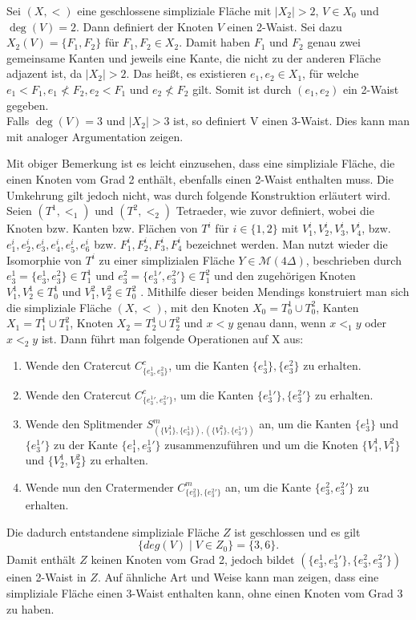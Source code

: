 \documentclass[12pt,titlepage]{article}
\begin{document}
\begin{bemerkung}
Sei $(X,<)$ eine geschlossene simpliziale Fläche mit $\vert X_2 \vert > 2$, $V \in X_0$ und $\deg(V)=2$. Dann definiert der Knoten $V$ einen 2-Waist. Sei dazu $X_2(V)=\{F_1,F_2\}$ für $F_1,F_2 \in X_2$. Damit haben $F_1$ und $F_2$ genau zwei gemeinsame Kanten und jeweils eine Kante, die nicht zu der anderen Fläche adjazent ist, da $\vert X_2 \vert > 2$. Das heißt, es existieren $e_1,e_2\in X_1$, für welche $e_1<F_1,e_1 \nless F_2, e_2<F_1$ und $e_2  \nless F_2$ gilt. Somit ist durch $(e_1,e_2)$ ein 2-Waist gegeben.\\
Falls $\deg(V)=3$ und $\vert X_2 \vert>3$ ist, so definiert V einen 3-Waist. Dies kann man mit analoger Argumentation zeigen.
\end{bemerkung}
Mit obiger Bemerkung ist es leicht einzusehen, dass eine simpliziale Fläche, die einen Knoten vom Grad 2 enthält, ebenfalls einen 2-Waist enthalten muss. Die Umkehrung gilt jedoch nicht, was durch folgende Konstruktion erläutert wird.\\
 Seien $(T^1,<_1)$ und $(T^2,<_2)$ Tetraeder, wie zuvor definiert, wobei die Knoten bzw. Kanten bzw. Flächen von $T^i$ für $i\in \{1,2\}$ mit $V_1^i,V_2^i,V_3^i,V_4^i$, bzw. $e_1^i,e_2^i,e_3^i,e_4^i,e_5^i,e_6^i$ bzw. $F_1^i,F_2^i,F_3^i,F_4^i$ bezeichnet werden. Man nutzt wieder die Isomorphie von  $T^i$ zu einer simplizialen Fläche $Y\in \mathcal{M}(4 \Delta)$, beschrieben durch $e_3^1 =\{e_3^1,e_3^2\}\in T^1_1 $ und $e_3^2=\{{e_3^1}',{e_3^2}'\}\in T^2_1$ 
   und den zugehörigen Knoten $V_1^1,V_2^1 \in T^1_0$ und $V_1^2,V_2^2 \in T^2_0$  . Mithilfe dieser beiden Mendings konstruiert man sich die simpliziale Fläche $(X,<)$, mit den Knoten $X_0=T^1_0 \cup T^2_0$, Kanten $X_1=T^1_1 \cup T^2_1$, Knoten $X_2=T^1_2 \cup T^2_2$ und $x<y$ genau dann, wenn $x<_1y$ oder $x<_2 y$ ist. Dann führt man folgende Operationen auf X aus:
 \begin{enumerate}
 \item Wende den Cratercut $C^c_{\{e_{3}^1,e_{3}^2\}}$, um die Kanten $\{e_3^1\},\{e_3^2\}$ zu erhalten.
 \item Wende den Cratercut $C^c_{\{{e_{3}^1}',{e_{3}^2}'\}}$, um die Kanten $\{{e_3^1}'\},\{{e_3^2}'\}$ zu erhalten.
\item Wende den Splitmender $S^m_{(\{V_1^1\},\{e_3^1\}),(\{V_1^2\},\{{e_3^1}'\})}$ an, um die Kanten $\{e_3^1\}$ und $\{{e_3^1}'\}$ zu der Kante $\{e_1^1,{e_3^1}'\}$ zusammenzuführen und um die Knoten $\{V_1^1,V_1^2\}$ und $\{V_2^1,V_2^2\}$ zu erhalten.
 \item Wende nun den Cratermender $C^m_{\{e_3^2\},\{{e_3^2}'\}}$ an, um die Kante $\{e_3^2,{e_3^2}'\}$ zu erhalten.
 \end{enumerate}
 Die dadurch entstandene simpliziale Fläche $Z$ ist geschlossen und es gilt
 \[
 \{deg(V)\mid V\in Z_0\}=\{3,6\}.
 \] 
 Damit enthält $Z$ keinen Knoten vom Grad 2, jedoch bildet $(\{e_{3}^1,{e_{3}^1}'\},\{e_{3}^2,{e_{3}^2}'\})$ einen 2-Waist in $Z$. Auf ähnliche Art und Weise kann man zeigen, dass eine simpliziale Fläche einen 3-Waist enthalten kann, ohne einen Knoten vom Grad 3 zu haben.\\
\end{document}
